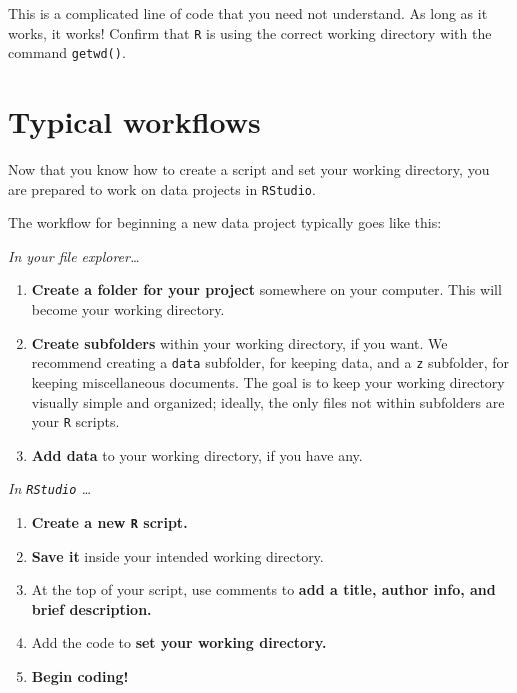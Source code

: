 \documentclass[
]{book}
\begin{document}
This is a complicated line of code that you need not understand. As long as it works, it works! Confirm that \texttt{R} is using the correct working directory with the command \texttt{getwd()}.

\hypertarget{typical-workflows}{%
\section*{Typical workflows}\label{typical-workflows}}

Now that you know how to create a script and set your working directory, you are prepared to work on data projects in \texttt{RStudio}.

The workflow for beginning a new data project typically goes like this:

\emph{In your file explorer\ldots{}}

\begin{enumerate}
\def\labelenumi{\arabic{enumi}.}
\item
  \textbf{Create a folder for your project} somewhere on your computer. This will become your working directory.
\item
  \textbf{Create subfolders} within your working directory, if you want. We recommend creating a \texttt{data} subfolder, for keeping data, and a \texttt{z} subfolder, for keeping miscellaneous documents. The goal is to keep your working directory visually simple and organized; ideally, the only files not within subfolders are your \texttt{R} scripts.
\item
  \textbf{Add data} to your working directory, if you have any.
\end{enumerate}

\emph{In \texttt{RStudio} \ldots{}}

\begin{enumerate}
\def\labelenumi{\arabic{enumi}.}
\setcounter{enumi}{3}
\item
  \textbf{Create a new \texttt{R} script.}
\item
  \textbf{Save it} inside your intended working directory.
\item
  At the top of your script, use comments to \textbf{add a title, author info, and brief description.}
\item
  Add the code to \textbf{set your working directory.}
\item
  \textbf{Begin coding!}
\end{enumerate}
\end{document}
